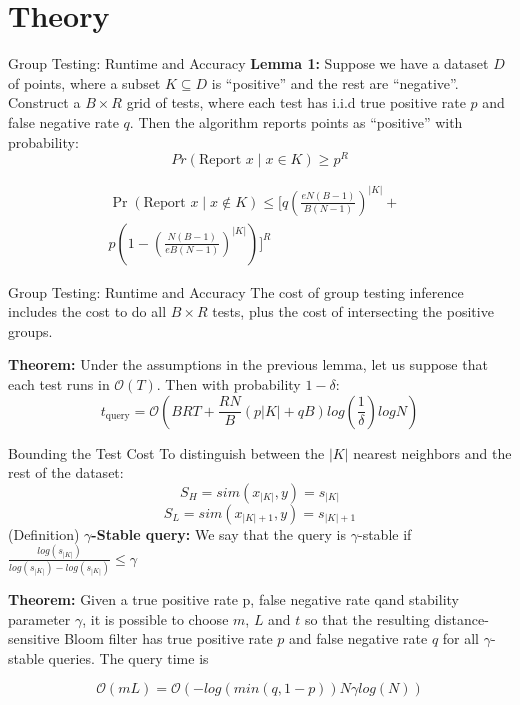 \documentclass[Serif, 10pt, brown]{beamer}
\theoremstyle{example}
\theoremstyle{plain}
\begin{document}
\section{Theory}
\begin{frame}{Group Testing: Runtime and Accuracy}
\textbf{Lemma 1:} Suppose we have a dataset $D$ of points, where a subset $K \subseteq D$ is ``positive'' and the rest are ``negative''. Construct a $B \times R$ grid of tests, where each test has i.i.d true positive rate $p$ and false negative rate $q$. Then the algorithm reports points as ``positive''	with probability:
\[
Pr(\text{Report } x \mid x \in K) \geq p^R
\]

\[
\begin{aligned}
\Pr(\text{Report } x \mid x \notin K) \leq 
\bigg[ q\left(\frac{eN(B-1)}{B(N-1)}\right)^{|K|} 
+ {} & \\
p\left(1 - \left(\frac{N(B-1)}{eB(N-1)}\right)^{|K|}\right) \bigg]^R &
\end{aligned}
\]
\end{frame}

\begin{frame}{Group Testing: Runtime and Accuracy}
	The cost of group testing inference includes the cost to do all $B \times R$ tests, plus the cost of intersecting the positive groups. 

	\textbf{Theorem:} Under the assumptions in the previous lemma, let us suppose that each test runs in $\mathcal{O}(T)$. Then with probability $1 - \delta$:
	\[
	t_{\text{query}} = \mathcal{O}\left(BRT + \frac{RN}{B}(p|K| + qB)log(\frac{1}{\delta})logN\right)
	\]
\end{frame}

\begin{frame}{Bounding the Test Cost}
	To distinguish between the $|K|$ nearest neighbors and the rest of the dataset:
	\[S_H = sim(x_{|K|}, y) = s_{|K|}\]
	\[S_L = sim(x_{|K| + 1}, y) = s_{|K| + 1}\]
	(Definition) $\gamma${\bf -Stable query:} We say that the query is $\gamma$-stable if $\frac{log(s_{|K|})}{log(s_{|K|}) - log(s_{|K|})} \leq \gamma$

	\vspace{0.5cm}
	\textbf{Theorem:} Given a true positive rate p, false negative rate qand stability parameter $\gamma$, it is possible to choose $m$, $L$ and $t$ so that the resulting distance-sensitive Bloom filter has true positive rate $p$ and false negative rate $q$ for all $\gamma$-stable queries. The query time is

	\[\mathcal{O}(mL) = \mathcal{O}(-log(min(q,1-p))N\gamma log(N))\]
\end{frame}
\end{document}
